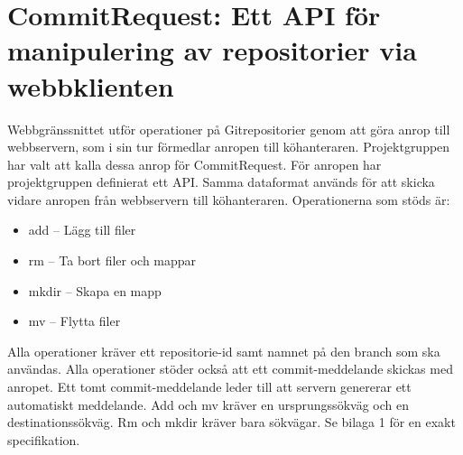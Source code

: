 \section{CommitRequest: Ett API för manipulering av repositorier via webbklienten}
Webbgränssnittet utför operationer på Gitrepositorier genom att göra anrop till webbservern, som i sin tur förmedlar anropen till köhanteraren. Projektgruppen har valt att kalla dessa anrop för CommitRequest.
För anropen har projektgruppen definierat ett API. Samma dataformat används för att skicka vidare anropen från webbservern till köhanteraren.
Operationerna som stöds är:

\begin{itemize}
  
  \item add – Lägg till filer
  \item rm – Ta bort filer och mappar
  \item mkdir – Skapa en mapp
  \item mv – Flytta filer
  
\end{itemize}

Alla operationer kräver ett repositorie-id samt namnet på den branch som ska användas. Alla operationer stöder också att ett commit-meddelande skickas med anropet. Ett tomt commit-meddelande leder till att servern genererar ett automatiskt meddelande. Add och mv kräver en ursprungssökväg och en destinationssökväg. Rm och mkdir kräver bara sökvägar.
Se bilaga 1 för en exakt specifikation.